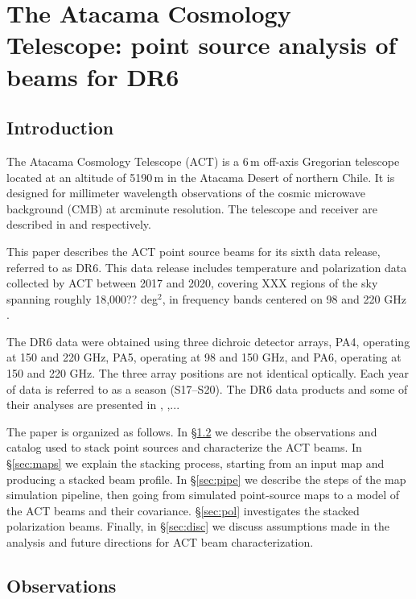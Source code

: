 \chapter{The Atacama Cosmology Telescope: point source analysis of beams for DR6}
\label{ch:actbeams}
\section{Introduction}
\label{sec:act_intro}


The Atacama Cosmology Telescope (ACT) is a 6\,m off-axis Gregorian telescope located at an altitude of 5190\,m in the Atacama Desert of northern Chile. It is designed for millimeter wavelength observations of the cosmic microwave background (CMB) at arcminute resolution.  The telescope and receiver are described in \cite{fowler_2007} and \cite{thornton_2016} respectively. 

This paper describes the ACT point source beams for its sixth data release, referred to as DR6. This data release includes temperature and polarization data collected by ACT between 2017 and 2020, covering XXX regions of the sky spanning roughly 18,000?? deg$^2$, in frequency bands centered on 98 and 220 GHz \citep{thornton_2016}.

The DR6 data were obtained using three dichroic detector arrays, PA4, operating at 150 and 220 GHz, PA5, operating at 98 and 150 GHz, and PA6, operating at 150 and 220 GHz.  The three array positions are not identical optically. Each year of data is referred to as a season (S17--S20).  The DR6 data products and some of their analyses are presented in  \cite{XXX}, \cite{aiola_2020},... 

The paper is organized as follows. 
In \S\ref{sec:obs} we describe the observations and catalog used to stack point sources and characterize the ACT beams.  In \S\ref{sec:maps} we explain the stacking process, starting from an input map and producing a stacked beam profile.  In \S\ref{sec:pipe} we describe the steps of the map simulation pipeline, then going from simulated point-source maps to a model of the ACT beams and their covariance.  \S\ref{sec:pol} investigates the stacked polarization beams.  Finally, in \S\ref{sec:disc} we discuss assumptions made in the analysis and future directions for ACT beam characterization.

\section{Observations}
\label{sec:obs}

